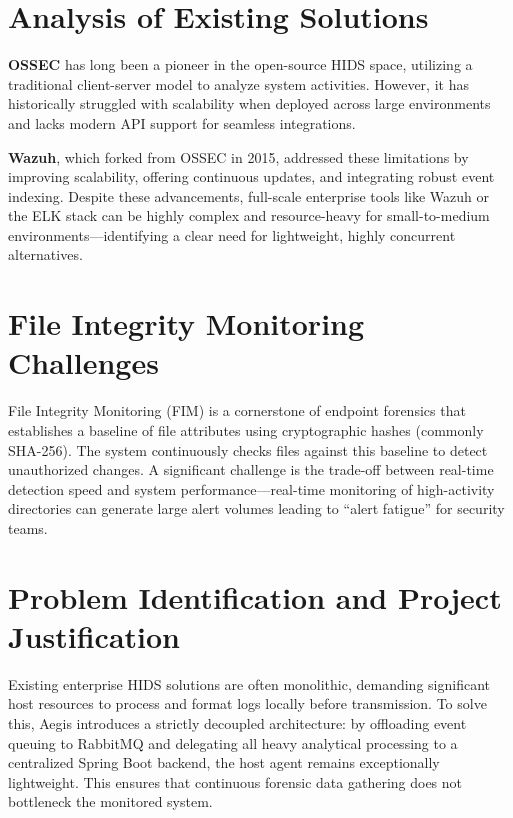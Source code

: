 \documentclass[12pt,a4paper]{report}
\begin{document}
\section{Analysis of Existing Solutions}

\textbf{OSSEC} has long been a pioneer in the open-source HIDS space, utilizing a traditional client-server model to analyze system activities. However, it has historically struggled with scalability when deployed across large environments and lacks modern API support for seamless integrations.

\textbf{Wazuh}, which forked from OSSEC in 2015, addressed these limitations by improving scalability, offering continuous updates, and integrating robust event indexing. Despite these advancements, full-scale enterprise tools like Wazuh or the ELK stack can be highly complex and resource-heavy for small-to-medium environments—identifying a clear need for lightweight, highly concurrent alternatives.

\section{File Integrity Monitoring Challenges}

File Integrity Monitoring (FIM) is a cornerstone of endpoint forensics that establishes a baseline of file attributes using cryptographic hashes (commonly SHA-256). The system continuously checks files against this baseline to detect unauthorized changes. A significant challenge is the trade-off between real-time detection speed and system performance—real-time monitoring of high-activity directories can generate large alert volumes leading to ``alert fatigue'' for security teams.

\section{Problem Identification and Project Justification}

Existing enterprise HIDS solutions are often monolithic, demanding significant host resources to process and format logs locally before transmission. To solve this, Aegis introduces a strictly decoupled architecture: by offloading event queuing to RabbitMQ and delegating all heavy analytical processing to a centralized Spring Boot backend, the host agent remains exceptionally lightweight. This ensures that continuous forensic data gathering does not bottleneck the monitored system.

\end{document}
